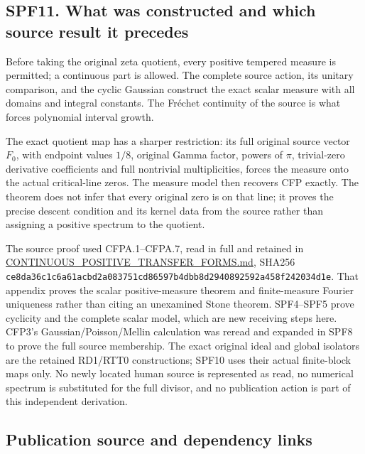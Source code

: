 \subsection{SPF11. What was constructed and which source result it
precedes}\label{spf11.-what-was-constructed-and-which-source-result-it-precedes}

Before taking the original zeta quotient, every positive tempered
measure is permitted; a continuous part is allowed. The complete source
action, its unitary comparison, and the cyclic Gaussian construct the
exact scalar measure with all domains and integral constants. The
Fréchet continuity of the source is what forces polynomial interval
growth.

The exact quotient map has a sharper restriction: its full original
source vector \(F_0\), with endpoint values \(1/8\), original Gamma
factor, powers of \(\pi\), trivial-zero derivative coefficients and full
nontrivial multiplicities, forces the measure onto the actual
critical-line zeros. The measure model then recovers CFP exactly. The
theorem does not infer that every original zero is on that line; it
proves the precise descent condition and its kernel data from the source
rather than assigning a positive spectrum to the quotient.

The source proof used CFPA.1--CFPA.7, read in full and retained in
\href{https://github.com/KokunoYumeto/zeta-function-research-reader/blob/main/workbenches/splitzero-tandem/continuations/20260925-full-source-tensor-and-original-divisor/gct/CONTINUOUS_POSITIVE_TRANSFER_FORMS.md}{CONTINUOUS\_POSITIVE\_TRANSFER\_FORMS.md},
SHA256
\texttt{ce8da36c1c6a61acbd2a083751cd86597b4dbb8d2940892592a458f242034d1e}.
That appendix proves the scalar positive-measure theorem and
finite-measure Fourier uniqueness rather than citing an unexamined Stone
theorem. SPF4--SPF5 prove cyclicity and the complete scalar model, which
are new receiving steps here. CFP3's Gaussian/Poisson/Mellin calculation
was reread and expanded in SPF8 to prove the full source membership. The
exact original ideal and global isolators are the retained RD1/RTT0
constructions; SPF10 uses their actual finite-block maps only. No newly
located human source is represented as read, no numerical spectrum is
substituted for the full divisor, and no publication action is part of
this independent derivation.

\subsection{Publication source and dependency
links}\label{publication-source-and-dependency-links}

